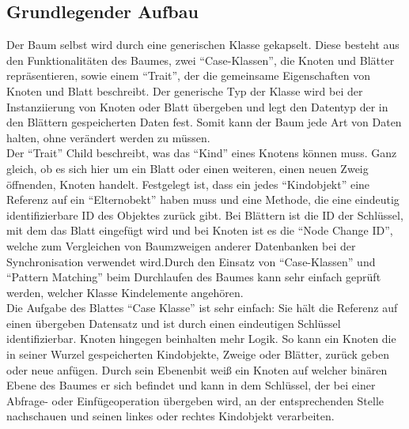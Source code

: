 \documentclass[a4paper,11pt,oneside,%
headsepline,												%
footsepline,												%
bibtotocnumbered									%
]{scrreprt}
\begin{document}
\subsection{Grundlegender Aufbau}
Der Baum selbst wird durch eine generischen Klasse gekapselt. Diese besteht aus den Funktionalitäten des Baumes, zwei \enquote{Case-Klassen}, die Knoten und Blätter repräsentieren, sowie einem \enquote{Trait}, der die gemeinsame Eigenschaften von Knoten und Blatt beschreibt. Der generische Typ der Klasse wird bei der Instanziierung von Knoten oder Blatt übergeben und legt den Datentyp der in den Blättern gespeicherten Daten fest. Somit kann der Baum jede Art von Daten halten, ohne verändert werden zu müssen.\\

Der \enquote{Trait} Child beschreibt, was das \enquote{Kind} eines Knotens können muss. Ganz gleich, ob es sich hier um ein Blatt oder einen weiteren, einen neuen Zweig öffnenden, Knoten handelt. Festgelegt ist, dass ein jedes \enquote{Kindobjekt} eine Referenz auf ein \enquote{Elternobekt} haben muss und eine Methode, die eine eindeutig identifizierbare ID des Objektes zurück gibt. Bei Blättern ist die ID der Schlüssel, mit dem das Blatt eingefügt wird und bei Knoten ist es die \enquote{Node Change ID}, welche zum Vergleichen von Baumzweigen anderer Datenbanken bei der Synchronisation verwendet wird.Durch den Einsatz von \enquote{Case-Klassen} und \enquote{Pattern Matching} beim Durchlaufen des Baumes kann sehr einfach geprüft werden, welcher Klasse Kindelemente angehören. \\

Die Aufgabe des Blattes \enquote{Case Klasse} ist sehr einfach: Sie hält die Referenz auf einen übergeben Datensatz und ist durch einen eindeutigen Schlüssel identifizierbar. Knoten hingegen beinhalten mehr Logik.  So kann ein Knoten die in seiner Wurzel gespeicherten Kindobjekte, Zweige oder Blätter, zurück geben oder neue anfügen. Durch sein Ebenenbit weiß ein Knoten auf welcher binären Ebene des Baumes er sich befindet und kann in dem Schlüssel, der bei einer Abfrage- oder Einfügeoperation übergeben wird, an der entsprechenden Stelle nachschauen und seinen linkes oder rechtes Kindobjekt verarbeiten.
\end{document}
